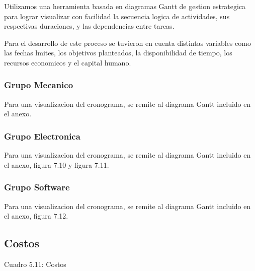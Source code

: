     Utilizamos una herramienta basada en diagramas Gantt de gestion estrategica para lograr
    visualizar con facilidad la secuencia logica de actividades, sus respectivas duraciones, y las
    dependencias entre tareas.

    Para el desarrollo de este proceso se tuvieron en cuenta distintas variables como las fechas
    lmites, los objetivos planteados, la disponibilidad de tiempo, los recursos economicos y el
    capital humano.

    \subsubsection{Grupo Mecanico}
    Para una visualizacion del cronograma, se remite al diagrama Gantt incluido en el anexo.
    \subsubsection{Grupo Electronica}
    Para una visualizacion del cronograma, se remite al diagrama Gantt incluido en el anexo,
    figura 7.10 y figura 7.11.
    \subsubsection{Grupo Software}
    Para una visualizacion del cronograma, se remite al diagrama Gantt incluido en el anexo,
    figura 7.12.

  \subsection{Costos}

    Cuadro 5.11: Costos
